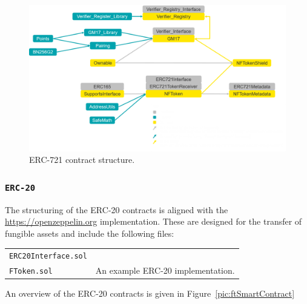 \begin{figure}[H]
	\begin{center}
		\begin{mdframed}[backgroundcolor=black,userdefinedwidth=\textwidth,align=center]
			\includegraphics[width=\textwidth]{images/nft-contracts.png}
		\end{mdframed}
	\end{center}
	\caption{ERC-721 contract structure.}
	\label{pic:nftSmartContract}
\end{figure}

\subsubsection{\texttt{ERC-20}}
The structuring of the ERC-20 contracts is aligned with the \url{https://openzeppelin.org} implementation.
These are designed for the transfer of fungible assets and include the following files: 
\begin{center}
	\begin{tabular}{ll}
		\texttt{ERC20Interface.sol} & \\
		\texttt{FToken.sol} & An example ERC-20 implementation. \\
	\end{tabular}
\end{center}
An overview of the ERC-20 contracts is given in Figure~\ref{pic:ftSmartContract}

